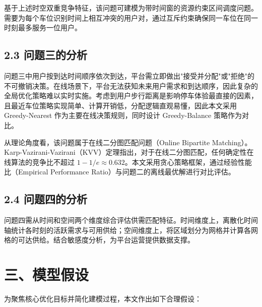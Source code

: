 \documentclass{ctexart}
\begin{document}
基于上述时空双重竞争特征，该问题可建模为带时间窗的资源约束区间调度问题。需要为每个车位识别时间上相互冲突的用户对，通过互斥约束确保同一车位在同一时刻最多服务一位用户。

\subsection*{2.3 问题三的分析}

问题三中用户按到达时间顺序依次到达，平台需立即做出"接受并分配"或"拒绝"的不可撤销决策。在线场景下，平台无法获知未来用户需求和到达顺序，因此复杂的全局优化策略难以实时实施。考虑到用户步行距离是影响停车体验最直接的因素，且最近车位策略实现简单、计算开销低，分配逻辑直观易懂，因此本文采用 Greedy-Nearest 作为主要在线决策规则，同时设计 Greedy-Balance 策略作为对比。

从理论角度看，该问题属于在线二分图匹配问题（Online Bipartite Matching）\cite{2}。Karp-Vazirani-Vazirani（KVV）定理指出，对于在线二分图匹配，任何确定性在线算法的竞争比不超过 $1-1/e \approx 0.632$。本文采用贪心策略框架，通过经验性能比（Empirical Performance Ratio）与问题二的离线最优解进行对比评估。

\subsection*{2.4 问题四的分析}

问题四需从时间和空间两个维度综合评估供需匹配特征。时间维度上，离散化时间轴统计各时刻的活跃需求与可用供给；空间维度上，将区域划分为网格并计算各网格的可达供给。结合敏感度分析，为平台运营提供数据支撑。

\section*{三、模型假设}

为聚焦核心优化目标并简化建模过程，本文作出如下合理假设：
\end{document}
